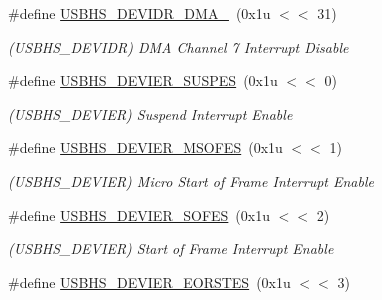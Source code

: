 \begin{DoxyCompactItemize}
\mbox{\label{group__SAME70__USBHS_ga47114c490f9c49872eaec366836ae82a}} 
\#define \mbox{\hyperlink{group__SAME70__USBHS_ga47114c490f9c49872eaec366836ae82a}{U\+S\+B\+H\+S\+\_\+\+D\+E\+V\+I\+D\+R\+\_\+\+D\+M\+A\+\_}}~(0x1u $<$$<$ 31)
\begin{DoxyCompactList}\small\item\em (U\+S\+B\+H\+S\+\_\+\+D\+E\+V\+I\+DR) D\+MA Channel 7 Interrupt Disable \end{DoxyCompactList}\item 
\mbox{\label{group__SAME70__USBHS_ga5ad81ac99d74f1231b972e9750d6cb4a}} 
\#define \mbox{\hyperlink{group__SAME70__USBHS_ga5ad81ac99d74f1231b972e9750d6cb4a}{U\+S\+B\+H\+S\+\_\+\+D\+E\+V\+I\+E\+R\+\_\+\+S\+U\+S\+P\+ES}}~(0x1u $<$$<$ 0)
\begin{DoxyCompactList}\small\item\em (U\+S\+B\+H\+S\+\_\+\+D\+E\+V\+I\+ER) Suspend Interrupt Enable \end{DoxyCompactList}\item 
\mbox{\label{group__SAME70__USBHS_ga225a9e428f65224fb3d621a95dcd4b83}} 
\#define \mbox{\hyperlink{group__SAME70__USBHS_ga225a9e428f65224fb3d621a95dcd4b83}{U\+S\+B\+H\+S\+\_\+\+D\+E\+V\+I\+E\+R\+\_\+\+M\+S\+O\+F\+ES}}~(0x1u $<$$<$ 1)
\begin{DoxyCompactList}\small\item\em (U\+S\+B\+H\+S\+\_\+\+D\+E\+V\+I\+ER) Micro Start of Frame Interrupt Enable \end{DoxyCompactList}\item 
\mbox{\label{group__SAME70__USBHS_ga7de30665df3c266939e6d925de57990a}} 
\#define \mbox{\hyperlink{group__SAME70__USBHS_ga7de30665df3c266939e6d925de57990a}{U\+S\+B\+H\+S\+\_\+\+D\+E\+V\+I\+E\+R\+\_\+\+S\+O\+F\+ES}}~(0x1u $<$$<$ 2)
\begin{DoxyCompactList}\small\item\em (U\+S\+B\+H\+S\+\_\+\+D\+E\+V\+I\+ER) Start of Frame Interrupt Enable \end{DoxyCompactList}\item 
\mbox{\label{group__SAME70__USBHS_gafca5592f127b2370fa403d94589ccc00}} 
\#define \mbox{\hyperlink{group__SAME70__USBHS_gafca5592f127b2370fa403d94589ccc00}{U\+S\+B\+H\+S\+\_\+\+D\+E\+V\+I\+E\+R\+\_\+\+E\+O\+R\+S\+T\+ES}}~(0x1u $<$$<$ 3)
$$
\end{DoxyCompactItemize}
